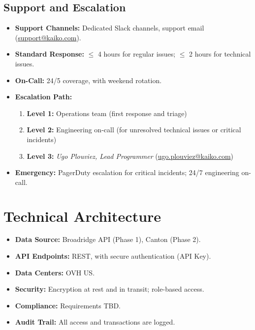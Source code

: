 \documentclass[12pt,a4paper]{article}
\begin{document}
\subsection*{Support and Escalation}
\begin{itemize}[leftmargin=*]
    \item \textbf{Support Channels:} Dedicated Slack channels, support email (\href{mailto:support@kaiko.com}{support@kaiko.com}).
    \item \textbf{Standard Response:} $\leq$ 4 hours for regular issues; $\leq$ 2 hours for technical issues.
    \item \textbf{On-Call:} 24/5 coverage, with weekend rotation.

    \item \textbf{Escalation Path:}
    \begin{enumerate}
        \item \textbf{Level 1:} Operations team (first response and triage)
        \item \textbf{Level 2:} Engineering on-call (for unresolved technical issues or critical incidents)
        \item \textbf{Level 3:} \textit{Ugo Plouviez, Lead Programmer} (\href{mailto:ugo.plouviez@kaiko.com}{ugo.plouviez@kaiko.com})
    \end{enumerate}

    \item \textbf{Emergency:} PagerDuty escalation for critical incidents; 24/7 engineering on-call.
\end{itemize}

\section{Technical Architecture}

\begin{itemize}[leftmargin=*]
    \item \textbf{Data Source:} Broadridge API (Phase 1), Canton (Phase 2).
    \item \textbf{API Endpoints:} REST, with secure authentication (API Key).
    \item \textbf{Data Centers:} OVH US.
    \item \textbf{Security:} Encryption at rest and in transit; role-based access.
    \item \textbf{Compliance:} Requirements TBD.
    \item \textbf{Audit Trail:} All access and transactions are logged.
\end{itemize}
\end{document}
